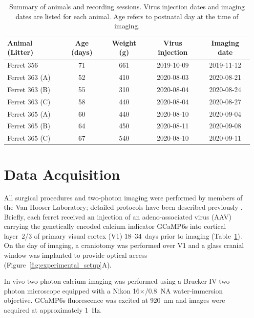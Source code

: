 \documentclass{brandeis-thesis3.3}
\begin{document}
\begin{table}[htbp]
  \centering
  \caption[Summary of animals and recording sessions.]{Summary of animals and recording sessions. Virus
    injection dates and imaging dates are listed for each
    animal. Age refers to postnatal day at the time of imaging.\\}
  \label{tab:animals}
  \begin{tabular}{lcccc}
    \hline
    Animal (Litter) & Age (days) & Weight (g)
      & Virus injection & Imaging date \\
    \hline
    Ferret 356       & 71 & 661 & 2019-10-09 & 2019-11-12 \\
    Ferret 363 (A)   & 52 & 410 & 2020-08-03 & 2020-08-21 \\
    Ferret 363 (B)   & 55 & 310 & 2020-08-04 & 2020-08-24 \\
    Ferret 363 (C)   & 58 & 440 & 2020-08-04 & 2020-08-27 \\
    Ferret 365 (A)   & 60 & 440 & 2020-08-10 & 2020-09-04 \\
    Ferret 365 (B)   & 64 & 450 & 2020-08-11 & 2020-09-08 \\
    Ferret 365 (C)   & 67 & 540 & 2020-08-10 & 2020-09-11 \\
    \hline
  \end{tabular}
\end{table}

\section{Data Acquisition}
\label{sec:data_acquisition}

All surgical procedures and two-photon imaging were performed
by members of the Van Hooser Laboratory; detailed protocols
have been described previously
\citep{VanHooser2015, Smith2016}. Briefly, each ferret
received an injection of an adeno-associated virus (AAV)
carrying the genetically encoded calcium indicator GCaMP6s
into cortical layer~2/3 of primary visual cortex (V1)
18--34~days prior to imaging
(Table~\ref{tab:animals}). On the day of imaging, a
craniotomy was performed over V1 and a glass cranial window
was implanted to provide optical access
(Figure~\ref{fig:experimental_setup}A).

In vivo two-photon calcium imaging was performed using a
Brucker IV two-photon microscope equipped with a
Nikon 16$\times$/0.8~NA water-immersion objective. GCaMP6s
fluorescence was excited at 920~nm and images were acquired
at approximately 1~Hz.
\end{document}
